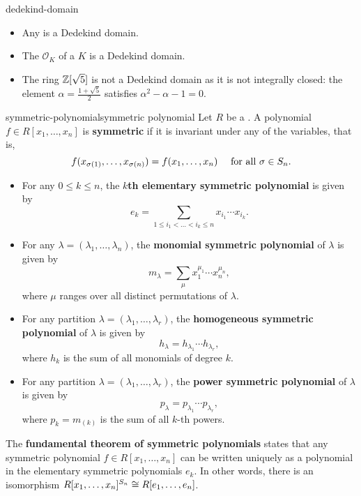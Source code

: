 \begin{example}{dedekind-domain}
    \begin{itemize}
        \item Any  is a Dedekind domain.
        \item The  $\mathcal{O}_K$ of a  $K$ is a Dedekind domain.
        \item The ring $\mathbb{Z}[\sqrt{5}]$ is not a Dedekind domain as it is not integrally closed: the element $\alpha = \frac{1 + \sqrt{5}}{2}$ satisfies $\alpha^2 - \alpha - 1 = 0$.
    \end{itemize}
\end{example}

\begin{topic}{symmetric-polynomial}{symmetric polynomial}
    Let $R$ be a . A polynomial $f \in R[x_1, \ldots, x_n]$ is \textbf{symmetric} if it is invariant under any  of the variables, that is,
    \[ f(x_{\sigma(1)}, \ldots, x_{\sigma(n)}) = f(x_1, \ldots, x_n) \quad \textup{ for all } \sigma \in S_n . \]
    \begin{itemize}
        \item For any $0 \le k \le n$, the \textbf{$k$th elementary symmetric polynomial} is given by
        \[ e_k = \sum_{1 \le i_1 < \ldots < i_k \le n} x_{i_1} \cdots x_{i_k} . \]
        \item For any  $\lambda = (\lambda_1, \ldots, \lambda_n)$, the \textbf{monomial symmetric polynomial} of $\lambda$ is given by
        \[ m_\lambda = \sum_{\mu} x_1^{\mu_1} \cdots x_n^{\mu_n} , \]
        where $\mu$ ranges over all distinct permutations of $\lambda$.
        \item For any partition $\lambda = (\lambda_1, \ldots, \lambda_r)$, the \textbf{homogeneous symmetric polynomial} of $\lambda$ is given by
        \[ h_\lambda = h_{\lambda_1} \cdots h_{\lambda_r} , \]
        where $h_k$ is the sum of all monomials of degree $k$.
        \item For any partition $\lambda = (\lambda_1, \ldots, \lambda_r)$, the \textbf{power symmetric polynomial} of $\lambda$ is given by
        \[ p_\lambda = p_{\lambda_1} \cdots p_{\lambda_r} , \]
        where $p_k = m_{(k)}$ is the sum of all $k$-th powers.
    \end{itemize}
    The \textbf{fundamental theorem of symmetric polynomials} states that any symmetric polynomial $f \in R[x_1, \ldots, x_n]$ can be written uniquely as a polynomial in the elementary symmetric polynomials $e_k$. In other words, there is an isomorphism $R[x_1, \ldots, x_n]^{S_n} \cong R[e_1, \ldots, e_n]$.
\end{topic}

